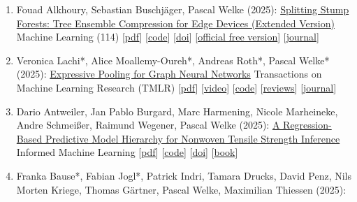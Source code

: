 \documentclass{scrartcl}
\begin{document}
\begin{enumerate}
{[\href{https://icml.cc/2025}{conference}]
}
\item
\label{alkhoury2025splittingstumpsextended}
Fouad Alkhoury, Sebastian Buschjäger, Pascal Welke (2025):\newline
\href{https://dx.doi.org/10.1007/s10994-025-06866-2}{Splitting Stump Forests: Tree Ensemble Compression for Edge Devices (Extended Version)}\newline
Machine Learning (114)\newline
{\footnotesize
[\href{https://pwelke.de/publications/alkhoury2025splittingstumpsextended.pdf}{pdf}]
[\href{https://github.com/FouadAlkhoury/SplittingStumpsForests/}{code}]
[\href{https://dx.doi.org/10.1007/s10994-025-06866-2}{doi}]
[\href{https://rdcu.be/eCNqw}{official free version}]
[\href{https://www.springer.com/journal/10994}{journal}]
}
\item
\label{lmrw2025xp}
Veronica Lachi*, Alice Moallemy-Oureh*, Andreas Roth*, Pascal Welke* (2025):\newline
\href{https://openreview.net/forum?id=xGADInGWMt}{Expressive Pooling for Graph Neural Networks}\newline
Transactions on Machine Learning Research (TMLR)\newline
{\footnotesize
[\href{https://pwelke.de/publications/lmrw2025poolingtmlr.pdf}{pdf}]
[\href{https://youtu.be/AYKAB76UAPQ}{video}]
[\href{https://github.com/aliicee3/brec-pooling}{code}]
[\href{https://openreview.net/forum?id=xGADInGWMt}{reviews}]
[\href{https://jmlr.org/tmlr}{journal}]
}
\item
\label{Antweiler2025}
Dario Antweiler, Jan Pablo Burgard, Marc Harmening, Nicole Marheineke, Andre Schmeißer, Raimund Wegener, Pascal Welke (2025):\newline
\href{https://dx.doi.org/10.1007/978-3-031-83097-6_4}{A Regression-Based Predictive Model Hierarchy for Nonwoven Tensile Strength Inference}\newline
Informed Machine Learning\newline
{\footnotesize
[\href{https://pwelke.de/publications/antweiler2025informedml.pdf}{pdf}]
[\href{https://github.com/pwelke/random-nonwoven-fibers}{code}]
[\href{https://dx.doi.org/10.1007/978-3-031-83097-6_4}{doi}]
[\href{https://link.springer.com/book/10.1007/978-3-031-83097-6}{book}]
}
\item
\label{bausejogl2025outerplanarfull}
Franka Bause*, Fabian Jogl*, Patrick Indri, Tamara Drucks, David Penz, Nils Morten Kriege, Thomas Gärtner, Pascal Welke, Maximilian Thiessen (2025):\newline

\end{enumerate}
\end{document}
